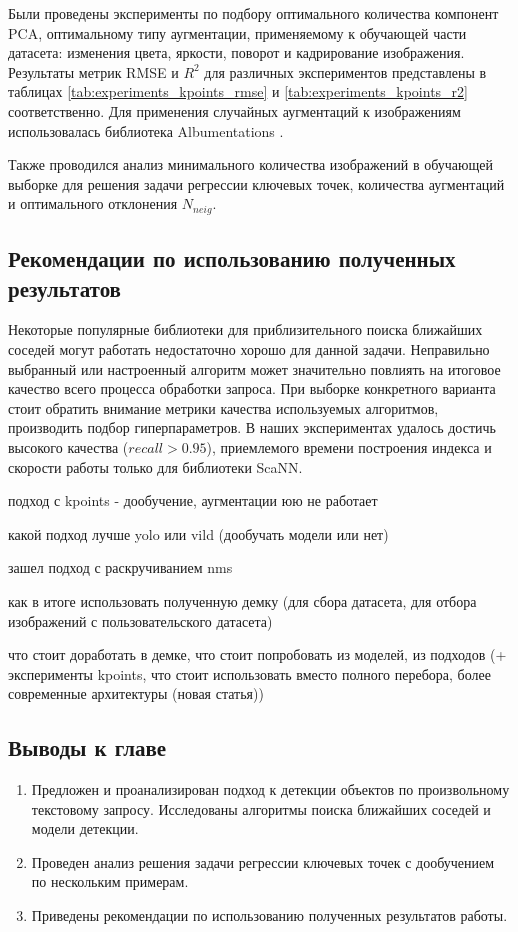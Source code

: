 \documentclass[a4paper,14pt]{article}
\begin{document}
    Были проведены эксперименты по подбору оптимального количества компонент PCA, оптимальному типу аугментации, применяемому к обучающей части датасета: изменения цвета, яркости, поворот и кадрирование изображения.
    Результаты метрик RMSE и $R^2$ для различных экспериментов представлены в таблицах \ref{tab:experiments_kpoints_rmse} и \ref{tab:experiments_kpoints_r2} соответственно. Для применения случайных аугментаций к изображениям использовалась библиотека Albumentations \cite{albumentations}.

    Также проводился анализ минимального количества изображений в обучающей выборке для решения задачи регрессии ключевых точек, количества аугментаций и оптимального отклонения $N_{neig}$.

    \subsection{Рекомендации по использованию полученных результатов}

    Некоторые популярные библиотеки для приблизительного поиска ближайших соседей могут работать недостаточно хорошо для данной задачи.
    Неправильно выбранный или настроенный алгоритм может значительно повлиять на итоговое качество всего процесса обработки запроса.
    При выборке конкретного варианта стоит обратить внимание метрики качества используемых алгоритмов, производить подбор гиперпараметров.
    В наших экспериментах удалось достичь высокого качества ($recall > 0.95$), приемлемого времени построения индекса и скорости работы только для библиотеки ScaNN.

    подход с kpoints - дообучение, аугментации юю не работает

    какой подход лучше yolo или vild (дообучать модели или нет)

    зашел подход с раскручиванием nms

    как в итоге использовать полученную демку (для сбора датасета, для отбора изображений с пользовательского датасета)

    что стоит доработать в демке, что стоит попробовать из моделей, из подходов (+ эксперименты kpoints, что стоит использовать вместо полного перебора, более современные архитектуры (новая статья))

    \subsection{Выводы к главе \thesection}
    \begin{enumerate}
        \itemsep0em
        \item Предложен и проанализирован подход к детекции объектов по произвольному текстовому запросу. Исследованы алгоритмы поиска ближайших соседей и модели детекции.
        \item Проведен анализ решения задачи регрессии ключевых точек с дообучением по нескольким примерам.
        \item Приведены рекомендации по использованию полученных результатов работы.
    \end{enumerate}
\end{document}
